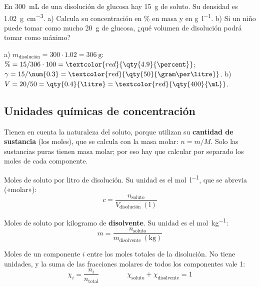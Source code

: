\begin{exercise}
    En \qty{300}{\mL} de una disolución de glucosa hay \qty{15}{\gram} de soluto. Su densidad es \qty{1.02}{\gram\per\cubic\cm}.
    a) Calcula su concentración en \% en masa y en \unit{\gram\per\litre}. b) Si un niño puede tomar como mucho \qty{20}{\gram}
    de glucosa, ¿qué volumen de disolución podrá tomar como máximo?
    \begin{solu}
        a) \(m_{\text{disolución}} = 300 \cdot \num{1.02} = \qty{306}{\gram}\): \(\% = 15/306 \cdot 100 = \textcolor{red}{\qty{4.9}{\percent}}\);
        \(\gamma = 15/\num{0.3} = \textcolor{red}{\qty{50}{\gram\per\litre}}\). b) \(V = 20/50 = \qty{0.4}{\litre} = \textcolor{red}{\qty{400}{\mL}}\).
    \end{solu}
\end{exercise}

\subsection{Unidades químicas de concentración}

Tienen en cuenta la naturaleza del soluto, porque utilizan su \textbf{cantidad de sustancia} (los moles), que se calcula con la
masa molar: \(n = m/M\). Solo las sustancias puras tienen masa molar; por eso hay que calcular por separado los moles de cada
componente.

\begin{definition}
    Moles de soluto por litro de disolución. Su unidad es el \unit{\mol\per\litre}, que se abrevia \unit{\M} («molar»):
    \[ c = \frac{n_{\text{soluto}}}{V_{\text{disolución}}\ (\unit{\litre})} \]
\end{definition}

\begin{definition}[Molalidad]
    Moles de soluto por kilogramo de \textbf{disolvente}. Su unidad es el \unit{\mol\per\kilo\gram}:
    \[ m = \frac{n_{\text{soluto}}}{m_{\text{disolvente}}\ (\unit{\kilo\gram})} \]
\end{definition}

\begin{definition}
    Moles de un componente \(i\) entre los moles totales de la disolución. No tiene unidades, y la suma de las fracciones molares
    de todos los componentes vale 1:
    \[ \chi_i = \frac{n_i}{n_{\text{total}}} \qquad\qquad \chi_{\text{soluto}} + \chi_{\text{disolvente}} = 1 \]
\end{definition}

